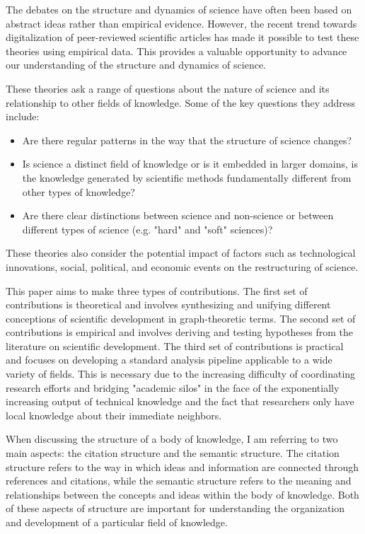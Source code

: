 The debates on the structure and dynamics of science have often been based on abstract ideas rather than 
empirical evidence. However, the recent trend towards digitalization of peer-reviewed scientific articles 
has made it possible to test these theories using empirical data. This provides a valuable opportunity to 
advance our understanding of the structure and dynamics of science.

These theories ask a range of questions about the nature of science and its relationship to other fields 
of knowledge. Some of the key questions they address include: 
\begin{itemize}
    \item Are there regular patterns in the way that the structure of science changes?
    \item Is science a distinct field of knowledge or is it embedded in larger domains, is the 
    knowledge generated by scientific methods fundamentally different from other types of knowledge?
    \item Are there clear distinctions between science and non-science or between different types of 
    science (e.g. "hard" and "soft" sciences)? 
\end{itemize}

These theories also consider the potential impact of factors such as technological innovations, 
social, political, and economic events on the restructuring of science.

This paper aims to make three types of contributions. The first set of contributions is theoretical 
and involves synthesizing and unifying different conceptions of scientific development in graph-theoretic 
terms. The second set of contributions is empirical and involves deriving and testing hypotheses from the 
literature on scientific development. The third set of contributions is practical and focuses on developing 
a standard analysis pipeline applicable to a wide variety of fields. This is necessary due to the increasing 
difficulty of coordinating research efforts and bridging "academic silos" in the face of the exponentially 
increasing output of technical knowledge and the fact that researchers only have local knowledge about their 
immediate neighbors.

When discussing the structure of a body of knowledge, I am referring to two main aspects: the citation 
structure and the semantic structure. The citation structure refers to the way in which ideas and information 
are connected through references and citations, while the semantic structure refers to the meaning and relationships 
between the concepts and ideas within the body of knowledge. Both of these aspects of structure are important for 
understanding the organization and development of a particular field of knowledge.